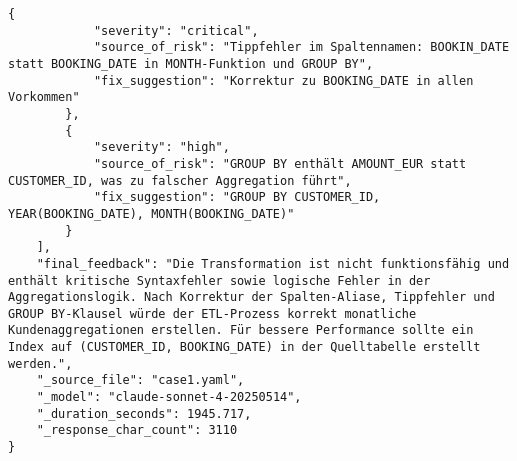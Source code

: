 \begin{lstlisting}[caption={Ausgabe: Claude Sonnet 4 Anwendungsfall 1 Robustheitsdurchlauf},label={claude_case1_prompt3}]
        {
            "severity": "critical",
            "source_of_risk": "Tippfehler im Spaltennamen: BOOKIN_DATE statt BOOKING_DATE in MONTH-Funktion und GROUP BY",
            "fix_suggestion": "Korrektur zu BOOKING_DATE in allen Vorkommen"
        },
        {
            "severity": "high",
            "source_of_risk": "GROUP BY enthält AMOUNT_EUR statt CUSTOMER_ID, was zu falscher Aggregation führt",
            "fix_suggestion": "GROUP BY CUSTOMER_ID, YEAR(BOOKING_DATE), MONTH(BOOKING_DATE)"
        }
    ],
    "final_feedback": "Die Transformation ist nicht funktionsfähig und enthält kritische Syntaxfehler sowie logische Fehler in der Aggregationslogik. Nach Korrektur der Spalten-Aliase, Tippfehler und GROUP BY-Klausel würde der ETL-Prozess korrekt monatliche Kundenaggregationen erstellen. Für bessere Performance sollte ein Index auf (CUSTOMER_ID, BOOKING_DATE) in der Quelltabelle erstellt werden.",
    "_source_file": "case1.yaml",
    "_model": "claude-sonnet-4-20250514",
    "_duration_seconds": 1945.717,
    "_response_char_count": 3110
}
\end{lstlisting}

